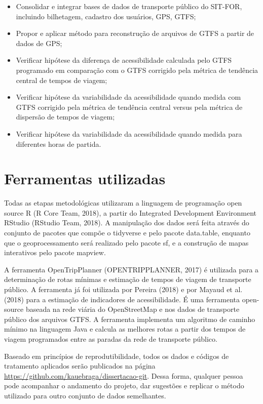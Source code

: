 \documentclass[        
    a4paper,          %
    12pt,             %
    chapter=TITLE,    %
    section=Title,    %
    subsection=Title, %
    oneside,          %
    english,          %
    spanish,          %
    brazil,           %
    fleqn             %
]{abntex2}
\begin{document}
  \begin{itemize}
  \tightlist
  \item
    Consolidar e integrar bases de dados de transporte público do SIT-FOR, incluindo bilhetagem, cadastro dos usuários, GPS, GTFS;
  \item
    Propor e aplicar método para reconstrução de arquivos de GTFS a partir de dados de GPS;
  \item
    Verificar hipótese da diferença de acessibilidade calculada pelo GTFS programado em comparação com o GTFS corrigido pela métrica de tendência central de tempos de viagem;
  \item
    Verificar hipótese da variabilidade da acessibilidade quando medida com GTFS corrigido pela métrica de tendência central versus pela métrica de dispersão de tempos de viagem;
  \item
    Verificar hipótese da variabilidade da acessibilidade quando medida para diferentes horas de partida.
  \end{itemize}
  
  \hypertarget{ferramentas-utilizadas}{%
  \section{Ferramentas utilizadas}\label{ferramentas-utilizadas}}
  
  Todas as etapas metodológicas utilizaram a linguagem de programação open source R (R Core Team, 2018), a partir do Integrated Development Environment RStudio (RStudio Team, 2018). A manipulação dos dados será feita através do conjunto de pacotes que compõe o tidyverse e pelo pacote data.table, enquanto que o geoprocessamento será realizado pelo pacote sf, e a construção de mapas interativos pelo pacote mapview.
  
  A ferramenta OpenTripPlanner (OPENTRIPPLANNER, 2017) é utilizada para a determinação de rotas mínimas e estimação de tempos de viagem de transporte público. A ferramenta já foi utilizada por Pereira (2018) e por Mayaud et al. (2018) para a estimação de indicadores de acessibilidade. É uma ferramenta open-source baseada na rede viária do OpenStreetMap e nos dados de transporte público dos arquivos GTFS. A ferramenta implementa um algoritmo de caminho mínimo na linguagem Java e calcula as melhores rotas a partir dos tempos de viagem programados entre as paradas da rede de transporte público.
  
  Baseado em princípios de reprodutibilidade, todos os dados e códigos de tratamento aplicados serão publicados na página \url{https://github.com/kauebraga/dissertacao-git}. Dessa forma, qualquer pessoa pode acompanhar o andamento do projeto, dar sugestões e replicar o método utilizado para outro conjunto de dados semelhantes.
  
\end{document}
